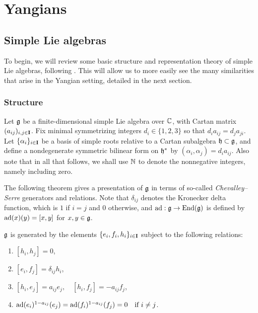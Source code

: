 \chapter{Yangians}\label{chap:yangians}

\section{Simple Lie algebras}

To begin, we will review some basic structure and representation theory of simple Lie algebras, following \cite{humphreys_introduction_1972}.
This will allow us to more easily see the many similarities that arise in the Yangian setting, detailed in the next section.


\subsection{Structure}

Let $\mathfrak{g}$ be a finite-dimensional simple Lie algebra over $\mathbb{C}$, with Cartan matrix $(a_{ij})_{i,j\in\mathbf{I}}$.
Fix minimal symmetrizing integers $d_i\in\{1,2,3\}$ so that $d_ia_{ij}=d_ja_{ji}$.
Let $\{\alpha_i\}_{i\in\mathbf{I}}$ be a basis of simple roots relative to a Cartan subalgebra $\mathfrak{h}\subset\mathfrak{g}$, and define a nondegenerate symmetric bilinear form on $\mathfrak{h}^{*}$ by $(\alpha_i,\alpha_j)=d_ia_{ij}$.
Also note that in all that follows, we shall use $\mathbb{N}$ to denote the nonnegative integers, namely including zero.

The following theorem gives a presentation of $\mathfrak{g}$ in terms of so-called \emph{Chevalley--Serre} generators and relations.
Note that $\delta_{ij}$ denotes the Kronecker delta function, which is $1$ if $i=j$ and $0$ otherwise, and $\operatorname{ad}:\mathfrak{g}\to\operatorname{End}(\mathfrak{g})$ is defined by $\operatorname{ad}(x)(y)=[x,y]$ for $x,y\in\mathfrak{g}$.

\begin{theorem}[Serre]\label{T:Serre}
    $\mathfrak{g}$ is generated by the elements $\{e_i,f_i,h_i\}_{i\in\mathbf{I}}$ subject to the following relations:
    \begin{enumerate}
        \item $[h_i,h_j] = 0$,
        \item $[e_i,f_j] = \delta_{ij}h_i$,
        \item $[h_i,e_j] = a_{ij}e_j, \quad [h_i,f_j] = -a_{ij}f_j$,
        \item $\operatorname{ad}(e_i)^{1-a_{ij}}(e_j) = \operatorname{ad}(f_i)^{1-a_{ij}}(f_j) = 0 \quad\text{if } i\neq j$.
    \end{enumerate}
\end{theorem}

